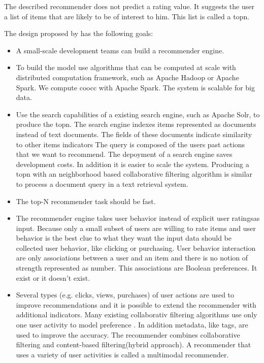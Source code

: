 The described recommender does not predict a rating value. It suggests the user a list of items that are likely to be of interest to him. This list is called a \gls{topn}.

The design proposed by \cite{Dunning14} has the following goals:
\begin{itemize}
\item A small-scale development teams can build a recommender engine.
\item To build the model use algorithms that can be computed at scale with distributed computation framework, such as Apache Hadoop or Apache Spark. We compute \gls{coocc} with Apache Spark. The system is \gls{scalable} for big data.
\item Use the search capabilities of a existing search engine, such as Apache Solr, to produce the \gls{topn}. The search engine indexes items represented as documents instead of text documents. The fields of these documents indicate similarity to other items indicators The query is composed of the users past actions that we want to recommend. The depoyment of a search engine saves development costs. In addition it is easier to scale the system. Producing a \gls{topn} with an neighborhood based collaborative filtering algorithm is similar to process a document query in a text retrieval system. 
\item The top-N recommender task should be fast.
\item The recommender engine takes user behavior instead of explicit user ratingsas input. Because only a small subset of users are willing to rate items and user behavior is the best clue to what they want the input data should be collected user behavior, like clicking or purchasing. User behavior interaction are only associations between a user and an item and there is no notion of strength represented as number. This associations are Boolean preferences. It exist or it doesn't exist. 
\item Several types (e.g. clicks, views, purchases) of user actions are used to improve recommendations and it is possible to extend the recommender with additional \glspl{indicator}. Many existing collaborativ filtering algorithms use only one user activity to model preference \cite{ferrel}. In addition metadata, like tags, are used to improve the accuracy. The recommender combines collaborative filtering and content-based filtering(hybrid approach). A recommender that uses a variety of user activities is called a \gls{multimodal} recommender. 
\end{itemize}

